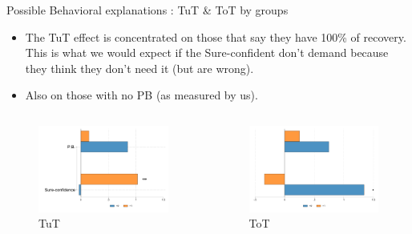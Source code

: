 \documentclass[8pt]{beamer}
\begin{document}
\begin{frame}{Possible Behavioral explanations : TuT \& ToT by groups}

\begin{itemize}
    \item The TuT effect is concentrated on those that say they have 100\% of recovery. This is what we would expect if the Sure-confident don't demand because they think they don't need it (but are wrong).
    \item Also on those with no PB (as measured by us).
\end{itemize}
\begin{columns}
\begin{column}{.45\textwidth}
    \begin{figure}[H]
    \caption{TuT}
        \includegraphics[width=1.1\textwidth]{Figuras/tut_beh_partition.pdf}
\end{figure}
\end{column}

\begin{column}{.45\textwidth}
    \begin{figure}[H]
    \caption{ToT}
        \includegraphics[width=1.1\textwidth]{Figuras/tot_beh_partition.pdf}
\end{figure}
\end{column}
\end{columns}
\end{frame}
\end{document}

